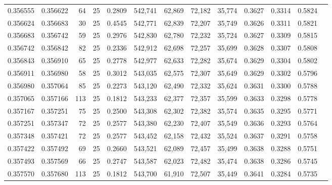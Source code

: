 \begin{tabular}{rrrrrrrrrrrrr}
0.356555 & 0.356622 &    64 &  25 &                                     0.2809 & 542,741 &  62,869 &  72,182 &  35,774 & 0.3627 & 0.3314 & 0.5824 \\
0.356624 & 0.356683 &    30 &  25 &                                     0.4545 & 542,771 &  62,839 &  72,207 &  35,749 & 0.3626 & 0.3311 & 0.5821 \\
0.356683 & 0.356742 &    59 &  25 &                                     0.2976 & 542,830 &  62,780 &  72,232 &  35,724 & 0.3627 & 0.3309 & 0.5815 \\
0.356742 & 0.356842 &    82 &  25 &                                     0.2336 & 542,912 &  62,698 &  72,257 &  35,699 & 0.3628 & 0.3307 & 0.5808 \\
0.356843 & 0.356910 &    65 &  25 &                                     0.2778 & 542,977 &  62,633 &  72,282 &  35,674 & 0.3629 & 0.3304 & 0.5802 \\
0.356911 & 0.356980 &    58 &  25 &                                     0.3012 & 543,035 &  62,575 &  72,307 &  35,649 & 0.3629 & 0.3302 & 0.5796 \\
0.356980 & 0.357064 &    85 &  25 &                                     0.2273 & 543,120 &  62,490 &  72,332 &  35,624 & 0.3631 & 0.3300 & 0.5788 \\
0.357065 & 0.357166 &   113 &  25 &                                     0.1812 & 543,233 &  62,377 &  72,357 &  35,599 & 0.3633 & 0.3298 & 0.5778 \\
0.357167 & 0.357251 &    75 &  25 &                                     0.2500 & 543,308 &  62,302 &  72,382 &  35,574 & 0.3635 & 0.3295 & 0.5771 \\
0.357251 & 0.357347 &    72 &  25 &                                     0.2577 & 543,380 &  62,230 &  72,407 &  35,549 & 0.3636 & 0.3293 & 0.5764 \\
0.357348 & 0.357421 &    72 &  25 &                                     0.2577 & 543,452 &  62,158 &  72,432 &  35,524 & 0.3637 & 0.3291 & 0.5758 \\
0.357422 & 0.357492 &    69 &  25 &                                     0.2660 & 543,521 &  62,089 &  72,457 &  35,499 & 0.3638 & 0.3288 & 0.5751 \\
0.357493 & 0.357569 &    66 &  25 &                                     0.2747 & 543,587 &  62,023 &  72,482 &  35,474 & 0.3638 & 0.3286 & 0.5745 \\
0.357570 & 0.357680 &   113 &  25 &                                     0.1812 & 543,700 &  61,910 &  72,507 &  35,449 & 0.3641 & 0.3284 & 0.5735 \\

\end{tabular}
